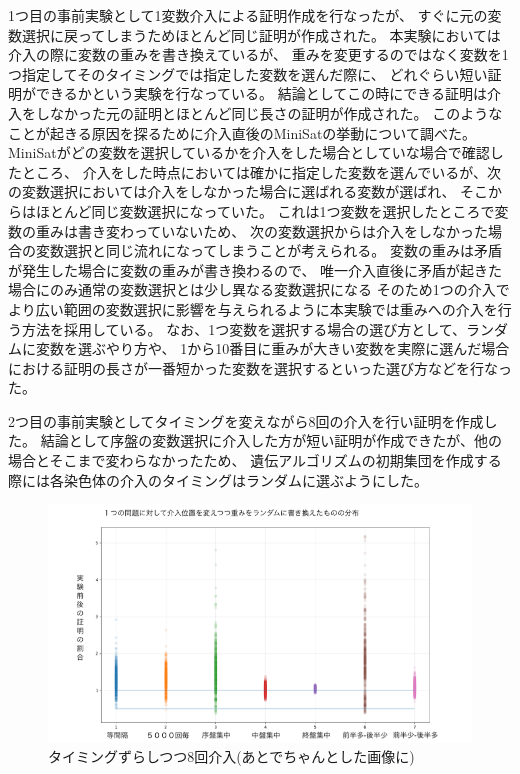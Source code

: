 1つ目の事前実験として1変数介入による証明作成を行なったが、
すぐに元の変数選択に戻ってしまうためほとんど同じ証明が作成された。
本実験においては介入の際に変数の重みを書き換えているが、
重みを変更するのではなく変数を1つ指定してそのタイミングでは指定した変数を選んだ際に、
どれぐらい短い証明ができるかという実験を行なっている。
結論としてこの時にできる証明は介入をしなかった元の証明とほとんど同じ長さの証明が作成された。
このようなことが起きる原因を探るために介入直後のMiniSatの挙動について調べた。
MiniSatがどの変数を選択しているかを介入をした場合としていな場合で確認したところ、
介入をした時点においては確かに指定した変数を選んでいるが、次の変数選択においては介入をしなかった場合に選ばれる変数が選ばれ、
そこからはほとんど同じ変数選択になっていた。
これは1つ変数を選択したところで変数の重みは書き変わっていないため、
次の変数選択からは介入をしなかった場合の変数選択と同じ流れになってしまうことが考えられる。
変数の重みは矛盾が発生した場合に変数の重みが書き換わるので、
唯一介入直後に矛盾が起きた場合にのみ通常の変数選択とは少し異なる変数選択になる
そのため1つの介入でより広い範囲の変数選択に影響を与えられるように本実験では重みへの介入を行う方法を採用している。
なお、1つ変数を選択する場合の選び方として、ランダムに変数を選ぶやり方や、
1から10番目に重みが大きい変数を実際に選んだ場合における証明の長さが一番短かった変数を選択するといった選び方などを行なった。



2つ目の事前実験としてタイミングを変えながら8回の介入を行い証明を作成した。
結論として序盤の変数選択に介入した方が短い証明が作成できたが、他の場合とそこまで変わらなかったため、
遺伝アルゴリズムの初期集団を作成する際には各染色体の介入のタイミングはランダムに選ぶようにした。

\begin{figure}[h]
    \centering
    \includegraphics[width=17.5cm]{figures/Experiment0/1.png}
    \caption{タイミングずらしつつ8回介入(あとでちゃんとした画像に)}
\end{figure}





